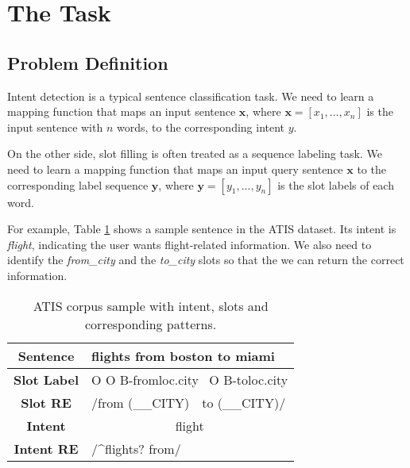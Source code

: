 \section{The Task}
\subsection{Problem Definition}
Intent detection is a typical sentence classification task.
We need to learn a mapping function that maps an input sentence $\textbf{x}$, where $\textbf{x}=[x_{1}, ..., x_{n}]$ is the input sentence with $n$ words, to the corresponding intent $y$.

On the other side, slot filling is often treated as a sequence labeling task. 
We need to learn a mapping function that maps an input query sentence $\textbf{x}$ to the corresponding label sequence $\textbf{y}$, where $\textbf{y}=[y_{1}, ..., y_{n}]$ is the slot labels of each word.

For example, Table \ref{atis_sample} shows a sample sentence in the ATIS dataset. Its intent is \emph{flight}, indicating the user wants flight-related information. We also need to identify the \emph{from\_city} and the \emph{to\_city} slots so that the we can return the correct information.

\begin{table}
\setlength{\tabcolsep}{0.23em}
\centering
\small{
\begin{tabular}{|c|l|}

\hline
\textbf{Sentence} &flights \;\;\; from \;\;\;\;\; boston \;\;\;\;\;\;\; to \;\;\;\; miami  \\
\hline
\textbf{Slot Label} &\;\;\; O \;\;\;\;\;\;\;\; O \;\; B-fromloc.city \, O \; B-toloc.city \\
\hline
\textbf{Slot RE} & \multicolumn{1}{|l|}{\quad\quad\quad\;\;/from \quad (\_\_CITY) \;\;\;\;\,\, to \quad (\_\_CITY)/} \\
\hline
\textbf{Intent} &\multicolumn{1}{|c|}{flight} \\
\hline
\textbf{Intent RE} & \multicolumn{1}{|l|}{/\textasciicircum flights? from/} \\
\hline
\end{tabular}
}
\caption{ATIS corpus sample with intent, slots and corresponding \RE patterns.}
\label{atis_sample}
\end{table}


